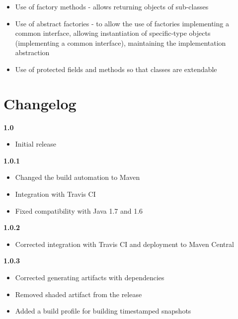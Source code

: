 \begin{itemize}
	\renewcommand{\labelitemi}{$\bullet$}
	\item Use of factory methods - allows returning objects of sub-classes
	\item Use of abstract factories - to allow the use of factories implementing a common interface, allowing instantiation of specific-type objects (implementing a common interface), maintaining the implementation abstraction
	\item Use of protected fields and methods so that classes are extendable
\end{itemize}







\chapter{Changelog}

\noindent
\textbf{1.0}
\begin{itemize}
	\renewcommand{\labelitemi}{$\bullet$}
	\item Initial release
\end{itemize}
\newline

\noindent
\textbf{1.0.1}
\begin{itemize}
	\renewcommand{\labelitemi}{$\bullet$}
	\item Changed the build automation to Maven
	\item Integration with Travis CI
	\item Fixed compatibility with Java 1.7 and 1.6
\end{itemize}
\newline

\noindent
\textbf{1.0.2}
\begin{itemize}
	\renewcommand{\labelitemi}{$\bullet$}
	\item Corrected integration with Travis CI and deployment to Maven Central
\end{itemize}
\newline

\noindent
\textbf{1.0.3}
\begin{itemize}
	\renewcommand{\labelitemi}{$\bullet$}
	\item Corrected generating artifacts with dependencies
	\item Removed shaded artifact from the release
	\item Added a build profile for building timestamped snapshots
\end{itemize}
\newline

